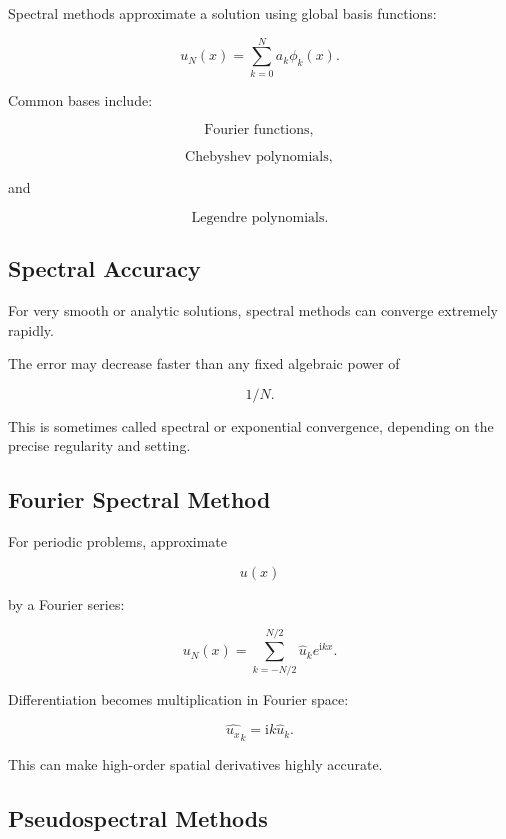 Spectral methods approximate a solution using global basis functions:

\[
\boxed{
u_N(x)
=
\sum_{k=0}^{N}
a_k\phi_k(x).
}
\]

Common bases include:

\[
\boxed{
\text{Fourier functions},
}
\]

\[
\boxed{
\text{Chebyshev polynomials},
}
\]

and

\[
\boxed{
\text{Legendre polynomials}.
}
\]

\subsection{Spectral Accuracy}
\label{subsec:spectral-accuracy}

For very smooth or analytic solutions, spectral methods can converge
extremely rapidly.

The error may decrease faster than any fixed algebraic power of

\[
1/N.
\]

This is sometimes called spectral or exponential convergence, depending on
the precise regularity and setting.

\subsection{Fourier Spectral Method}
\label{subsec:fourier-spectral-method}

For periodic problems, approximate

\[
u(x)
\]

by a Fourier series:

\[
\boxed{
u_N(x)
=
\sum_{k=-N/2}^{N/2}
\widehat{u}_k
e^{\mathrm{i}kx}.
}
\]

Differentiation becomes multiplication in Fourier space:

\[
\boxed{
\widehat{u_x}_k
=
\mathrm{i}k\widehat{u}_k.
}
\]

This can make high-order spatial derivatives highly accurate.

\subsection{Pseudospectral Methods}
\label{subsec:pseudospectral-methods}

